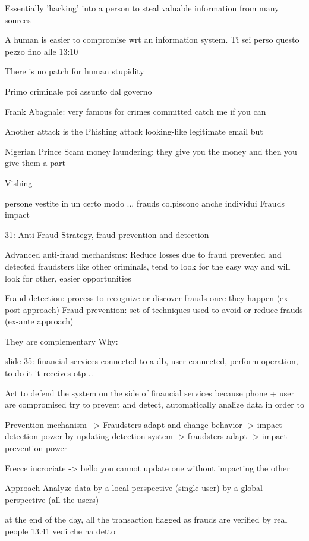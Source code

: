     Essentially 'hacking' into a person to steal valuable
    information from many sources

    A human is easier to compromise wrt an information system.
    Ti sei perso questo pezzo fino alle 13:10


    There is no patch for human stupidity

    Primo criminale poi assunto dal governo

    Frank Abagnale: very famous for crimes committed 
    catch me if you can 


    Another attack is the Phishing attack 
    looking-like legitimate email but 

    Nigerian Prince Scam
        money laundering: they give you the money and then you give them a part 

    Vishing

persone vestite in un certo modo ...
frauds colpiscono anche individui
Frauds impact


31: Anti-Fraud Strategy, fraud prevention and detection 

    Advanced anti-fraud mechanisms:
        Reduce losses due to fraud 
            prevented and detected 
            fraudsters like other criminals, tend to look for the easy way and will look for other, easier opportunities 

    
    Fraud detection: process to recognize or discover frauds once they happen (ex-post approach)
    Fraud prevention: set of techniques used to avoid or reduce frauds (ex-ante approach)

    They are complementary 
    Why:

    slide 35:
    financial services connected to a db, user connected, perform operation, to do it it receives otp ..

    Act to defend the system on the side of financial services 
    because phone + user are compromised 
    try to prevent and detect, automatically analize data in order to 

    Prevention mechanism --> Fraudsters adapt and change behavior -> impact detection power
    by updating detection system -> fraudsters adapt -> impact prevention power 

    Frecce incrociate -> bello 
    you cannot update one without impacting the other 

Approach 
    Analyze data 
        by a local perspective (single user)
        by a global perspective (all the users)

    at the end of the day, all the transaction flagged as frauds are verified by real people 13.41 vedi che ha detto  


